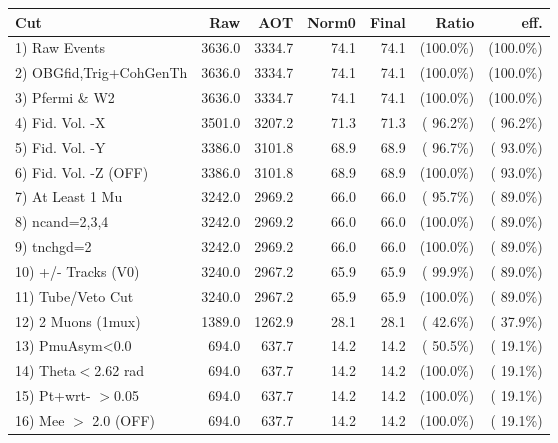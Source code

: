  \begin{table}[h!]\centering
 \begin{tabular}{||l||r|r|r|r|r|r||}
 \hline
 \hline
 Cut & Raw & AOT & Norm0 & Final & Ratio & eff.       \\
 \hline
  1) Raw Events           &       3636.0 &       3334.7 &         74.1 &         74.1 & (100.0\%) & (100.0\%) \\
  2) OBGfid,Trig+CohGenTh &       3636.0 &       3334.7 &         74.1 &         74.1 & (100.0\%) & (100.0\%) \\
  3) Pfermi \& W2         &       3636.0 &       3334.7 &         74.1 &         74.1 & (100.0\%) & (100.0\%) \\
  4) Fid. Vol. -X         &       3501.0 &       3207.2 &         71.3 &         71.3 & ( 96.2\%) & ( 96.2\%) \\
  5) Fid. Vol. -Y         &       3386.0 &       3101.8 &         68.9 &         68.9 & ( 96.7\%) & ( 93.0\%) \\
  6) Fid. Vol. -Z (OFF)   &       3386.0 &       3101.8 &         68.9 &         68.9 & (100.0\%) & ( 93.0\%) \\
  7) At Least 1 Mu        &       3242.0 &       2969.2 &         66.0 &         66.0 & ( 95.7\%) & ( 89.0\%) \\
  8) ncand=2,3,4          &       3242.0 &       2969.2 &         66.0 &         66.0 & (100.0\%) & ( 89.0\%) \\
  9) tnchgd=2             &       3242.0 &       2969.2 &         66.0 &         66.0 & (100.0\%) & ( 89.0\%) \\
 10) +/- Tracks (V0)      &       3240.0 &       2967.2 &         65.9 &         65.9 & ( 99.9\%) & ( 89.0\%) \\
 11) Tube/Veto Cut        &       3240.0 &       2967.2 &         65.9 &         65.9 & (100.0\%) & ( 89.0\%) \\
 12) 2 Muons (1mux)       &       1389.0 &       1262.9 &         28.1 &         28.1 & ( 42.6\%) & ( 37.9\%) \\
 13) PmuAsym<0.0          &        694.0 &        637.7 &         14.2 &         14.2 & ( 50.5\%) & ( 19.1\%) \\
 14) Theta$<$2.62 rad     &        694.0 &        637.7 &         14.2 &         14.2 & (100.0\%) & ( 19.1\%) \\
 15) Pt+wrt- $>$0.05      &        694.0 &        637.7 &         14.2 &         14.2 & (100.0\%) & ( 19.1\%) \\
 16) Mee $>$ 2.0  (OFF)   &        694.0 &        637.7 &         14.2 &         14.2 & (100.0\%) & ( 19.1\%) \\

\end{tabular}
\end{table}
